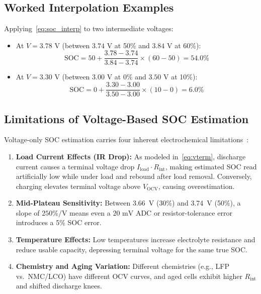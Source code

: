 \documentclass[12pt,a4paper]{article}
\begin{document}
\subsection{Worked Interpolation Examples}
Applying~\eqref{eq:soc_interp} to two intermediate voltages:
\begin{itemize}
    \item At $V = 3.78\text{ V}$ (between $3.74\text{ V}$ at 50\% and $3.84\text{ V}$ at 60\%):
    \[\text{SOC} = 50 + \frac{3.78 - 3.74}{3.84 - 3.74} \times (60 - 50) = 54.0\%\]
    \item At $V = 3.30\text{ V}$ (between $3.00\text{ V}$ at 0\% and $3.50\text{ V}$ at 10\%):
    \[\text{SOC} = 0 + \frac{3.30 - 3.00}{3.50 - 3.00} \times (10 - 0) = 6.0\%\]
\end{itemize}

\subsection{Limitations of Voltage-Based SOC Estimation}
Voltage-only SOC estimation carries four inherent electrochemical limitations~\cite{plett_bms1, plett_bms2}:
\begin{enumerate}
    \item \textbf{Load Current Effects (IR Drop):} As modeled in~\eqref{eq:vterm}, discharge current causes a terminal voltage drop $I_{\text{load}} \cdot R_{\text{int}}$, making estimated SOC read artificially low while under load and rebound after load removal. Conversely, charging elevates terminal voltage above $V_{\text{OCV}}$, causing overestimation.
    \item \textbf{Mid-Plateau Sensitivity:} Between 3.66~V (30\%) and 3.74~V (50\%), a slope of $250\%/\text{V}$ means even a $20\text{ mV}$ ADC or resistor-tolerance error introduces a 5\% SOC error.
    \item \textbf{Temperature Effects:} Low temperatures increase electrolyte resistance and reduce usable capacity, depressing terminal voltage for the same true SOC.
    \item \textbf{Chemistry and Aging Variation:} Different chemistries (e.g., LFP vs.\ NMC/LCO) have different OCV curves, and aged cells exhibit higher $R_{\text{int}}$ and shifted discharge knees.
\end{enumerate}

\end{document}
